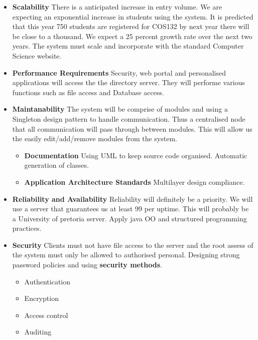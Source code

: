 
%

\begin{itemize}
	\item \textbf{Scalability}
		There is a anticipated increase in entry volume. We are expecting an exponential increase in students using the system. It is predicted that this year 750 students are registered for COS132 by next year there will be close to a thousand. We expect a 25 percent growth rate over the next two years. The system must scale and incorporate with the standard Computer Science website. 
	\item \textbf{Performance Requirements}
		Security, web portal and personalised applications will access the the directory server. They will performe various functions such as file access and Database access.
	\item \textbf{Maintanability}
		The system will be comprise of modules and using a Singleton design pattern to handle communication. Thus a centralised node that all communication will pass through between modules. This will allow us the easily edit/add/remove modules from the system.
		\begin{itemize}
			\item \textbf{Documentation}
				Using UML to keep source code organised. Automatic generation of classes.
			\item \textbf{Application Architecture Standards}
				Multilayer design compliance.
		\end{itemize}
	\item \textbf{Reliability and Availability}
		Reliability will definitely be a priority. We will use a server that guarantees us at least 99 per uptime. This will probably be a University of pretoria server. Apply java OO and structured programming practices.
	\item \textbf{Security}
		Clients must not have file access to the server and the root assess of the system must only be allowed to authorised personal. Designing strong password policies and using \textbf{security methods}.
		\begin{itemize}
			\item Authentication
			\item Encryption
			\item Access control
			\item Auditing

\end{itemize}
\end{itemize}
